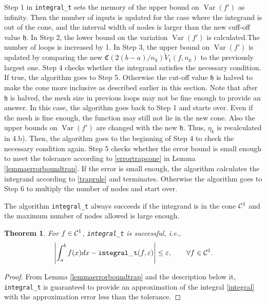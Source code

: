 \documentclass{iitthesis}
\DeclareMathOperator{\Var}{Var}
\newtheorem{theorem}{Theorem}
\theoremstyle{definition}
\theoremstyle{remark}
\begin{document}
Step 1 in {\tt integral\_t} sets the memory of the upper bound on $\Var(f')$ as infinity. Then the number of inputs is updated for the case where the integrand is out of the cone, and the interval width of nodes is larger than the new cuff-off value $\mathfrak{h}$. In Step 2, the lower bound on the variation $\Var(f')$ is calculated.The number of loops is increased by 1. In Step 3, the upper bound on $\Var(f')$ is updated by comparing the new $\mathfrak{C}(2(b-a)/n_{k})\widetilde{V}_1(f,n_k)$ to the previously largest one. Step 4 checks whether the integrand satisfies the necessary condition. If true, the algorithm goes to Step 5. Otherwise the cut-off value $\mathfrak{h}$ is halved to make the cone more inclusive as described earlier in this section. Note that after $\mathfrak{h}$ is halved, the mesh size in previous loops may not be fine enough to provide an answer. In this case, the algorithm goes back to Step 1 and starts over. Even if the mesh is fine enough, the function may still not lie in the new cone. Also the upper bounds on $\Var(f')$ are changed with the new $\mathfrak{h}$. Thus, $\eta_{k}$ is recalculated in 4.b). Then, the algorithm goes to the beginning of Step 4 to check the necessary condition again. Step 5 checks whether the error bound is small enough to meet the tolerance according to \eqref{errortrapcone} in Lemma \ref{lemmaerrorboundtrap}. If the error is small enough, the algorithm calculates the integrand according to \eqref{traprule} and terminates. Otherwise the algorithm goes to Step 6 to multiply the number of nodes and start over.

The algorithm {\tt integral\_t} always succeeds if the integrand is in the cone $\mathcal{C}^1$ and the maximum number of nodes allowed is large enough.
\begin{theorem}\label{thmTrap}
    For $f \in \mathcal{C}^1$, {\tt integral\_t} is successful, i.e.,
    \begin{equation*}
      \left|\int_{a}^{b}f(x)dx-{\tt integral\_t}(f,\varepsilon)\right|\le\varepsilon, \qquad \forall f\in \mathcal{C}^1.
    \end{equation*}
\end{theorem}
\begin{proof}
  From Lemma \ref{lemmaerrorboundtrap} and the description below it, {\tt integral\_t} is guaranteed to provide an approximation of the integral \eqref{integral} with the approximation error less than the tolerance.
\end{proof}
\end{document}
